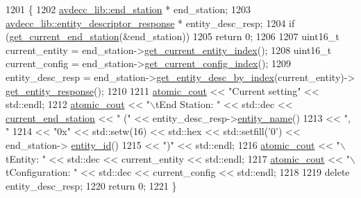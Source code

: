 \begin{DoxyCode}
1201 \{
1202     \hyperlink{classavdecc__lib_1_1end__station}{avdecc\_lib::end\_station} * end\_station;
1203     \hyperlink{classavdecc__lib_1_1entity__descriptor__response}{avdecc\_lib::entity\_descriptor\_response} * entity\_desc\_resp;
1204     \textcolor{keywordflow}{if} (\hyperlink{classcmd__line_aa7ddf8d9fbcf5d1c6c5f329bc850418c}{get\_current\_end\_station}(&end\_station))
1205         \textcolor{keywordflow}{return} 0;
1206 
1207     uint16\_t current\_entity = end\_station->\hyperlink{classavdecc__lib_1_1end__station_aaf7e2defcfdf88c62c04fd88bd49787d}{get\_current\_entity\_index}();
1208     uint16\_t current\_config = end\_station->\hyperlink{classavdecc__lib_1_1end__station_abaf546b5bb641dcf161f895e3d6d8cd8}{get\_current\_config\_index}();
1209     entity\_desc\_resp = end\_station->\hyperlink{classavdecc__lib_1_1end__station_a7456434346294f611e4d37255be4051b}{get\_entity\_desc\_by\_index}(current\_entity)->
      \hyperlink{classavdecc__lib_1_1entity__descriptor_ac31dd117f0c931ae93c8ba52df7211bd}{get\_entity\_response}();
1210 
1211     \hyperlink{cmd__line_8h_a0bc38ccc65c79ba06c6fcd7b4bf554c3}{atomic\_cout} << \textcolor{stringliteral}{"Current setting"} << std::endl;
1212     \hyperlink{cmd__line_8h_a0bc38ccc65c79ba06c6fcd7b4bf554c3}{atomic\_cout} << \textcolor{stringliteral}{"\(\backslash\)tEnd Station: "} << std::dec << 
      \hyperlink{classcmd__line_a67c43393f654ad7bc5c7caf29634cede}{current\_end\_station} << \textcolor{stringliteral}{" ("} << entity\_desc\_resp->\hyperlink{classavdecc__lib_1_1entity__descriptor__response_a3abd11ceacbf37b685377f2b73a502ca}{entity\_name}()
1213                 << \textcolor{stringliteral}{", "}
1214                 << \textcolor{stringliteral}{"0x"} << std::setw(16) << std::hex << std::setfill(\textcolor{charliteral}{'0'}) << end\_station->
      \hyperlink{classavdecc__lib_1_1end__station_a3374e7e9d63f8e1756480b16df9bc0c0}{entity\_id}()
1215                 << \textcolor{stringliteral}{")"} << std::endl;
1216     \hyperlink{cmd__line_8h_a0bc38ccc65c79ba06c6fcd7b4bf554c3}{atomic\_cout} << \textcolor{stringliteral}{"\(\backslash\)tEntity: "} << std::dec << current\_entity << std::endl;
1217     \hyperlink{cmd__line_8h_a0bc38ccc65c79ba06c6fcd7b4bf554c3}{atomic\_cout} << \textcolor{stringliteral}{"\(\backslash\)tConfiguration: "} << std::dec << current\_config << std::endl;
1218 
1219     \textcolor{keyword}{delete} entity\_desc\_resp;
1220     \textcolor{keywordflow}{return} 0;
1221 \}
\end{DoxyCode}


